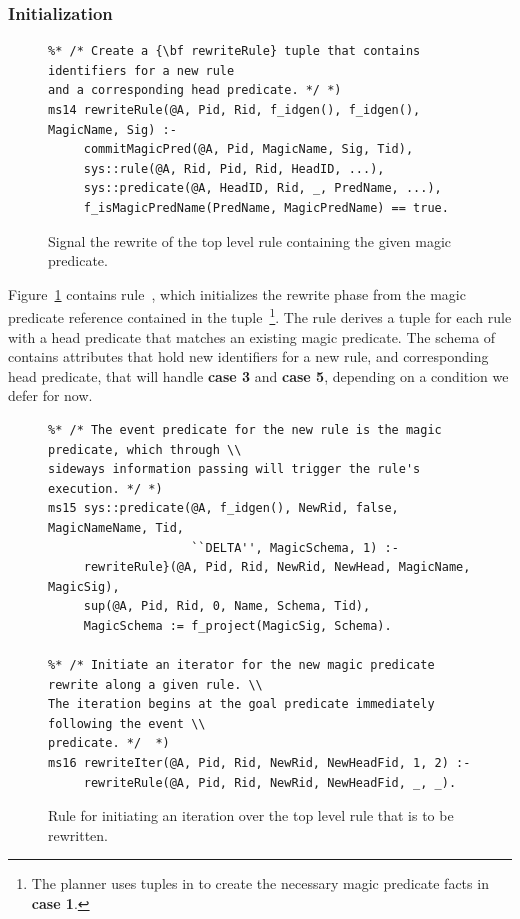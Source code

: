 \subsubsection{Initialization}

\begin{figure}[!t]
\ssp
\centering
\begin{lstlisting}
%* /* Create a {\bf rewriteRule} tuple that contains identifiers for a new rule
and a corresponding head predicate. */ *)
ms14 rewriteRule(@A, Pid, Rid, f_idgen(), f_idgen(), MagicName, Sig) :-
     commitMagicPred(@A, Pid, MagicName, Sig, Tid),
     sys::rule(@A, Rid, Pid, Rid, HeadID, ...),
     sys::predicate(@A, HeadID, Rid, _, PredName, ...),
     f_isMagicPredName(PredName, MagicPredName) == true.
\end{lstlisting}
\caption{\label{ch:magic:fig:rewrite1} Signal the rewrite of the top level rule 
containing the given magic predicate.}
\end{figure}

Figure~\ref{ch:magic:fig:rewrite1} contains rule~, which initializes
the rewrite phase from the magic predicate reference contained in the
 tuple~\footnote{The planner uses tuples in
 to create the necessary magic predicate facts in {\bf case
1}.}.  The rule derives a  tuple for each rule with a head
predicate that matches an existing magic predicate.  The schema of
 contains attributes that hold new identifiers for a new
rule, and corresponding head predicate, that will handle {\bf case 3} and
{\bf case 5}, depending on a condition we defer for now.

\begin{figure}[!t]
\ssp
\centering
\begin{lstlisting}
%* /* The event predicate for the new rule is the magic predicate, which through \\
sideways information passing will trigger the rule's execution. */ *)
ms15 sys::predicate(@A, f_idgen(), NewRid, false, MagicNameName, Tid, 
                    ``DELTA'', MagicSchema, 1) :-
     rewriteRule}(@A, Pid, Rid, NewRid, NewHead, MagicName, MagicSig),
     sup(@A, Pid, Rid, 0, Name, Schema, Tid),
     MagicSchema := f_project(MagicSig, Schema).

%* /* Initiate an iterator for the new magic predicate rewrite along a given rule. \\
The iteration begins at the goal predicate immediately following the event \\
predicate. */  *)
ms16 rewriteIter(@A, Pid, Rid, NewRid, NewHeadFid, 1, 2) :-
     rewriteRule(@A, Pid, Rid, NewRid, NewHeadFid, _, _).

\end{lstlisting}
\caption{\label{ch:magic:fig:rewrite2} Rule for initiating an iteration over the
top level rule that is to be rewritten. }
\end{figure}

